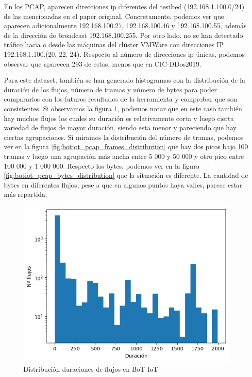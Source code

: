 En los PCAP, aparecen direcciones \acrshort{ip} diferentes del testbed (192.168.1.100.0/24) de las mencionadas en el paper original. Concretamente, podemos ver que aparecen adicionalmente 192.168.100.27, 192.168.100.46 y 192.168.100.55, además de la dirección de broadcast 192.168.100.255. Por otro lado, no se han detectado tráfico hacia o desde las máquinas del clúster VMWare con direcciones IP 192.168.1.100.(20, 22, 24). Respecto al número de direcciones \acrshort{ip} únicas, podemos observar que aparecen 293 de estas, menos que en CIC-DDos2019.

Para este dataset, también se han generado histogramas con la distribución de la duración de los flujos, número de tramas y número de bytes para poder compararlos con los futuros resultados de la herramienta y comprobar que son consistentes. Si observamos la figura \ref{fig:botiot_pcap_duration_distribution}, podemos notar que en este caso también hay muchos flujos los cuales su duración es relativamente corta y luego cierta variedad de flujos de mayor duración, siendo esta menor y pareciendo que hay ciertas agrupaciones. Si miramos la distribución del número de tramas, podemos ver en la figura \ref{fig:botiot_pcap_frames_distribution} que hay dos picos bajo 100 tramas y luego una agrupación más ancha entre 5 000 y 50 000 y otro pico entre 100 000 y 1 000 000. Respecto los bytes, podemos ver en la figura \ref{fig:botiot_pcap_bytes_distribution} que la situación es diferente. La cantidad de bytes en diferentes flujos, pese a que en algunos puntos haya valles, parece estar más repartida.

\begin{figure}[H]
    \begin{center}
        \includegraphics[width=0.40\linewidth]{media/botiot_pcap_duration_distribution.png}
    \end{center}
    \captionsetup{justification=centering}
    \caption{Distribución duraciones de flujos en BoT-IoT}\label{fig:botiot_pcap_duration_distribution}
\end{figure}

